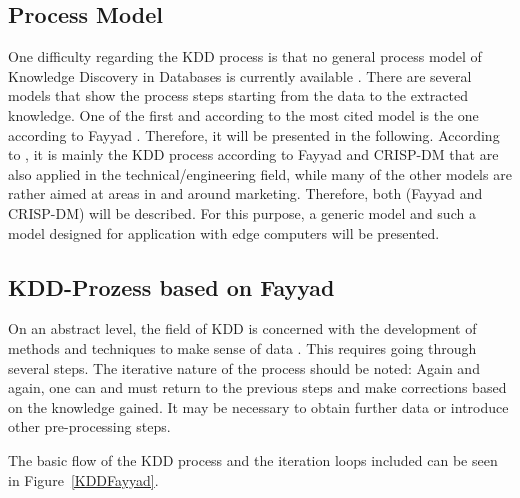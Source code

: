 \subsection{Process Model}

One difficulty regarding the KDD process is that \glqq no general process model of Knowledge Discovery in Databases is currently available \grqq \cite{Dusing:2000}. There are several models that show the process steps starting from the data to the extracted knowledge.  One of the first and according to \cite{Kurgan:2006} the most cited model is the one according to Fayyad \cite{Fayyad:1996}. Therefore, it will be presented in the following. According to \cite{Kurgan:2006}, it is mainly the KDD process according to Fayyad and CRISP-DM that are also applied in the technical/engineering field, while many of the other models are rather aimed at areas in and around marketing. Therefore, both (Fayyad and CRISP-DM) will be described.  For this purpose, a generic model and such a model designed for application with edge computers will be presented.


\subsection{KDD-Prozess based on Fayyad}
On an abstract level, the field of KDD is concerned with the development of methods and techniques to \glqq make sense of data \grqq \cite{Fayyad:1996}. This requires going through several steps. The iterative nature of the process should be noted: Again and again, one can and must return to the previous steps and make corrections based on the knowledge gained. It may be necessary to obtain further data or introduce other pre-processing steps. \cite{Wrobel:1998}

The basic flow of the KDD process and the iteration loops included can be seen in Figure~\ref{KDDFayyad}.

